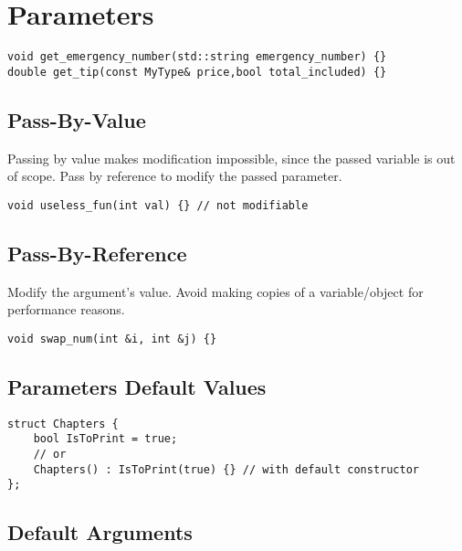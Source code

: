 \section{Parameters}

\begin{verbatim}
void get_emergency_number(std::string emergency_number) {}
double get_tip(const MyType& price,bool total_included) {}
\end{verbatim}

\subsection{Pass-By-Value}

Passing by value makes modification impossible, since the passed variable is out of scope.
Pass by reference to modify the passed parameter.

\begin{verbatim}
void useless_fun(int val) {} // not modifiable
\end{verbatim}

\subsection{Pass-By-Reference}

Modify the argument's value.
Avoid making copies of a variable/object for performance reasons.

\begin{verbatim}
void swap_num(int &i, int &j) {}
\end{verbatim}

\subsection{Parameters Default Values}

\begin{verbatim}
struct Chapters {
    bool IsToPrint = true;
    // or
    Chapters() : IsToPrint(true) {} // with default constructor
};
\end{verbatim}

\subsection{Default Arguments}

